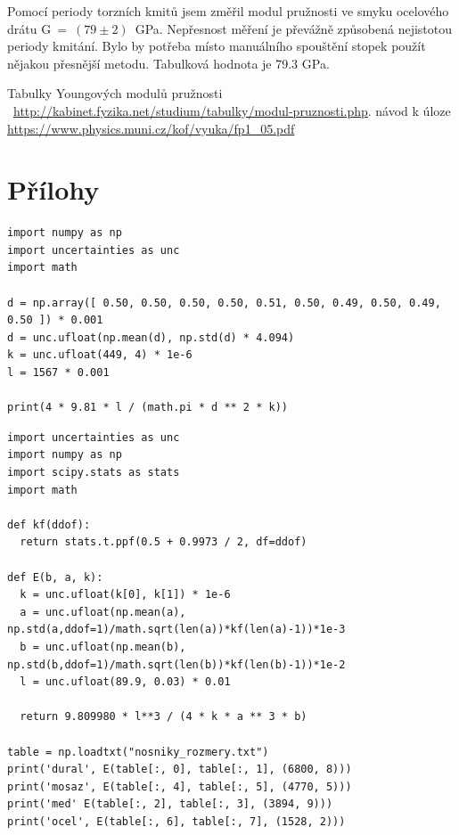 \documentclass[a4paper,11pt]{article}
\begin{document}
Pomocí periody torzních kmitů jsem změřil modul pružnosti ve smyku ocelového drátu \linebreak \mbox{G = $(79\pm2)$ GPa.} Nepřesnost měření je převážně způsobená nejistotou periody kmitání. Bylo by potřeba místo manuálního spouštění stopek použít nějakou přesnější metodu. Tabulková hodnota je 79.3 GPa. \\

\begin{thebibliography}{0}
 Tabulky Youngových modulů pružnosti ~\url{http://kabinet.fyzika.net/studium/tabulky/modul-pruznosti.php}.   
 návod k úloze \url{https://www.physics.muni.cz/kof/vyuka/fp1_05.pdf}
\end{thebibliography}



\section{Přílohy}

\begin{lstlisting}[caption={Výpočet modulu pružnosti v tahu přímou metodou }]
import numpy as np
import uncertainties as unc
import math

d = np.array([ 0.50, 0.50, 0.50, 0.50, 0.51, 0.50, 0.49, 0.50, 0.49, 0.50 ]) * 0.001
d = unc.ufloat(np.mean(d), np.std(d) * 4.094)
k = unc.ufloat(449, 4) * 1e-6
l = 1567 * 0.001

print(4 * 9.81 * l / (math.pi * d ** 2 * k))
\end{lstlisting}

\begin{lstlisting}[caption={Výpočet modulů pružností nosníků}]
import uncertainties as unc
import numpy as np
import scipy.stats as stats
import math

def kf(ddof):
  return stats.t.ppf(0.5 + 0.9973 / 2, df=ddof)

def E(b, a, k):
  k = unc.ufloat(k[0], k[1]) * 1e-6 
  a = unc.ufloat(np.mean(a), np.std(a,ddof=1)/math.sqrt(len(a))*kf(len(a)-1))*1e-3
  b = unc.ufloat(np.mean(b), np.std(b,ddof=1)/math.sqrt(len(b))*kf(len(b)-1))*1e-2
  l = unc.ufloat(89.9, 0.03) * 0.01

  return 9.809980 * l**3 / (4 * k * a ** 3 * b)

table = np.loadtxt("nosniky_rozmery.txt")
print('dural', E(table[:, 0], table[:, 1], (6800, 8)))
print('mosaz', E(table[:, 4], table[:, 5], (4770, 5)))
print('med' E(table[:, 2], table[:, 3], (3894, 9)))
print('ocel', E(table[:, 6], table[:, 7], (1528, 2)))
\end{lstlisting}
\end{document}

